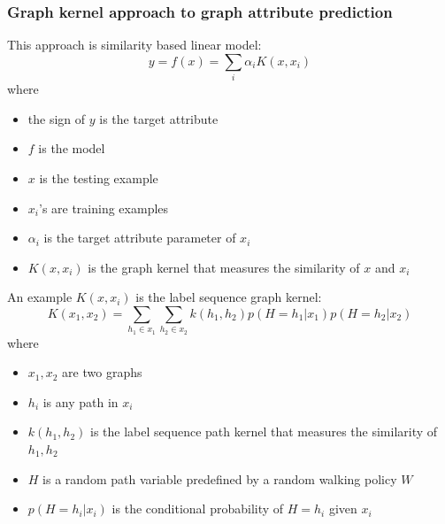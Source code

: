 \documentclass{article}
\begin{document}
\begin{landscape}
\subsubsection{Graph kernel approach to graph attribute prediction}
This approach is similarity based linear model:
\[ y = f(x) = \sum_{i} \alpha_i K(x, x_i) \]
where 
\begin{itemize}
	\item the sign of $ y $ is the target attribute
	\item $ f $ is the model
	\item $ x $ is the testing example
	\item $ x_i $'s are training examples
	\item $ \alpha_i $ is the target attribute parameter of $ x_i $
	\item $ K(x, x_i) $ is the graph kernel
	that measures the similarity of $ x $ and $ x_i $
\end{itemize}
An example $ K(x, x_i) $ is the label sequence graph kernel:
\[ K(x_1, x_2) =
\sum_{h_1 \in x_1} \sum_{h_2 \in x_2} 
k(h_1, h_2) p(H = h_1 | x_1) p(H = h_2 | x_2) \]
where
\begin{itemize}
	\item $ x_1, x_2 $ are two graphs
	\item $ h_i $ is any path in $ x_i $
	\item $ k(h_1, h_2) $ is the label sequence path kernel
	that measures the similarity of $ h_1, h_2 $
	\item $ H $ is a random path variable predefined by a random walking policy $ W $
	\item $ p(H = h_i | x_i) $ is the conditional probability of $ H = h_i $ given $ x_i $
\end{itemize}


\end{landscape}
\end{document}
